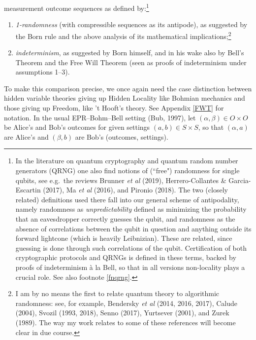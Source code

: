 \documentclass[12pt]{article}
\numberwithin{equation}{section}
\newcommand{\x}{\times}
\newcommand{\al}{\alpha} \newcommand{\bt}{L\beta}
\begin{document}
 measurement outcome sequences as defined by:\footnote{\label{mrd} In the literature on quantum cryptography and quantum random number generators (QRNG) one also find notions of (``free") randomness for single qubits, see e.g.\ the reviews Brunner  \emph{et al} (2019),   Herrero-Collantes \& Garcia-Escartin (2017), Ma \emph{et al} (2016), and Pironio (2018).
The two (closely related) definitions used there fall  into our general scheme of antipodality, namely randomness as \emph{unpredictability} defined as
minimizing the probability that an eavesdropper correctly guesses the qubit, and randomness as the absence of correlations between the qubit in question and anything outside its forward lightcone (which is heavily Leibnizian). These are related, since guessing is done through such correlations of the qubit.
 Certification of both cryptographic protocols and QRNGs is defined  in these terms, backed by proofs of indeterminism \`{a} la Bell, so that in all versions non-locality plays a crucial role. See also footnote \ref{fnqrng}.}
\begin{enumerate}
\item  \emph{1-randomness}  (with compressible sequences as its antipode), as suggested by the Born rule and the above analysis of its mathematical implications;\footnote{I am  by no means the first to relate quantum theory to algorithmic randomness: see, for example,  Bendersky \emph{et al} (2014, 2016, 2017),  Calude (2004), Svozil (1993, 2018),  Senno (2017), Yurtsever (2001), and Zurek (1989). The way my work relates to some of these references will become clear  in due course.}
\item \emph{indeterminism}, as suggested by Born himself, and  in his wake also by  Bell's Theorem and the Free Will Theorem  (seen as proofs  of indeterminism under  assumptions 1--3).
\end{enumerate}
To make this comparison precise, we once again need the case distinction between hidden variable theories giving up Hidden Locality like Bohmian mechanics and those giving up Freedom, like 't Hooft's theory.  See Appendix \ref{FWT} for notation.  In the usual  EPR--Bohm--Bell setting (Bub, 1997), let $(\al,\beta)\in O\x O$ be Alice's and Bob's outcomes for given settings $(a,b)\in S\x S$, so that $(\al,a)$ are Alice's and $(\beta,b)$ are Bob's (outcomes, settings).
\end{document}
